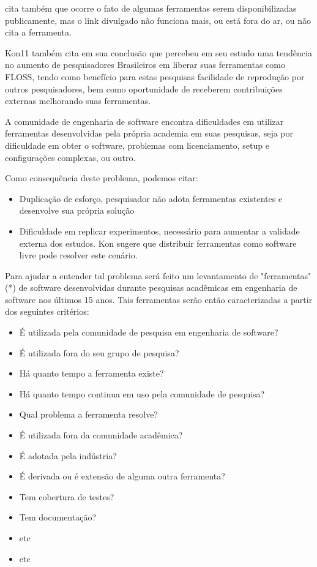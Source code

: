 \documentclass[11pt]{article}
\begin{document}
\cite{Kon11} cita também que ocorre o fato de algumas ferramentas serem
disponibilizadas publicamente, mas o link divulgado não funciona mais, ou está
fora do ar, ou não cita a ferramenta.

Kon11 também cita em sua conclusão que percebeu em seu estudo uma tendência no
aumento de pesquisadores Brasileiros em liberar suas ferramentas como FLOSS,
tendo como benefício para estas pesquisas facilidade de reprodução por outros
pesquisadores, bem como oportunidade de receberem contribuições externas
melhorando suas ferramentas.

A comunidade de engenharia de software encontra dificuldades em utilizar
ferramentas desenvolvidas pela própria academia em suas pesquisas, seja por
dificuldade em obter o software, problemas com licenciamento, setup e
configurações complexas, ou outro.

Como consequência deste problema, podemos citar:

\begin{itemize}
\item Duplicação de esforço, pesquisador não adota ferramentas existentes e
        desenvolve sua própria solução
\item Dificuldade em replicar experimentos, necessário para aumentar a
        validade externa dos estudos. Kon \cite{Kon11} sugere que distribuir
        ferramentas como software livre pode resolver este cenário.
\end{itemize}

Para ajudar a entender tal problema será feito um levantamento de
"ferramentas" (*) de software desenvolvidas durante pesquisas acadêmicas em
engenharia de software nos últimos 15 anos. Tais ferramentas serão então
caracterizadas a partir dos seguintes critérios:

\begin{itemize}
\item É utilizada pela comunidade de pesquisa em engenharia de software?
\item É utilizada fora do seu grupo de pesquisa?
\item Há quanto tempo a ferramenta existe?
\item Há quanto tempo continua em uso pela comunidade de pesquisa?
\item Qual problema a ferramenta resolve?
\item É utilizada fora da comunidade acadêmica?
\item É adotada pela indústria?
\item É derivada ou é extensão de alguma outra ferramenta?
\item Tem cobertura de testes?
\item Tem documentação?
\item etc
\item etc
\end{itemize}
\end{document}
